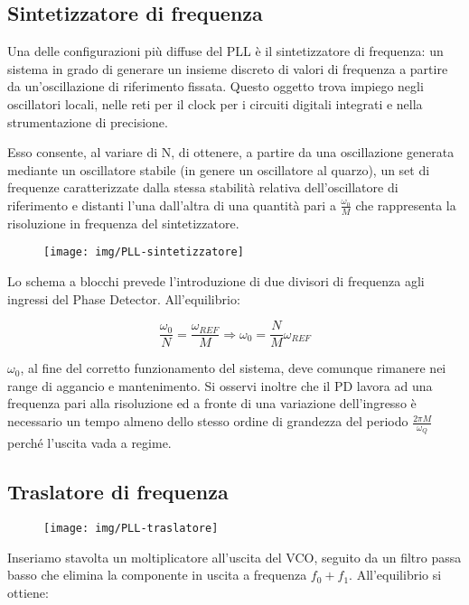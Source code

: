 \subsection{Sintetizzatore di frequenza}
Una delle configurazioni più diffuse del PLL è il sintetizzatore di frequenza: un sistema in grado di generare un insieme discreto di valori di frequenza a partire da un'oscillazione di riferimento fissata. Questo oggetto trova impiego negli oscillatori locali, nelle reti per il clock per i circuiti digitali integrati e nella strumentazione di precisione.

Esso consente, al variare di N, di ottenere, a partire da una oscillazione generata mediante un oscillatore stabile (in genere un oscillatore al quarzo), un set di frequenze caratterizzate dalla stessa stabilità relativa dell'oscillatore di riferimento e distanti l'una dall'altra di una quantità pari a $\frac{\omega_0}{M}$ che rappresenta la risoluzione in frequenza del sintetizzatore.

\begin{figure}[hbt]
	\centering
	\texttt{[image: img/PLL-sintetizzatore]}
	\caption{}
	\label{fig:pll-sintetizzatore}
\end{figure}


Lo schema a blocchi prevede l'introduzione di due divisori di frequenza agli ingressi del Phase Detector. All'equilibrio:

\[\frac{\omega_0}{N} = \frac{\omega_{REF}}{M} \Rightarrow \omega_0 = \frac{N}{M} \omega_{REF}  \]

$\omega_0$, al fine del corretto funzionamento del sistema, deve comunque rimanere nei range di aggancio e mantenimento. Si osservi inoltre che il PD lavora ad una frequenza pari alla risoluzione ed a fronte di una variazione dell'ingresso è necessario un tempo almeno dello stesso ordine di grandezza del periodo $\frac{2 \pi M}{\omega_Q}$ perché l'uscita vada a regime.
\subsection{Traslatore di frequenza}

\begin{figure}[hbt]
	\centering
	\texttt{[image: img/PLL-traslatore]}
	\caption{}
	\label{fig:pll-traslatore}
\end{figure}

Inseriamo stavolta un moltiplicatore all'uscita del VCO, seguito da un filtro passa basso che elimina la componente in uscita a frequenza $f_0 + f_1$. All'equilibrio si ottiene:


